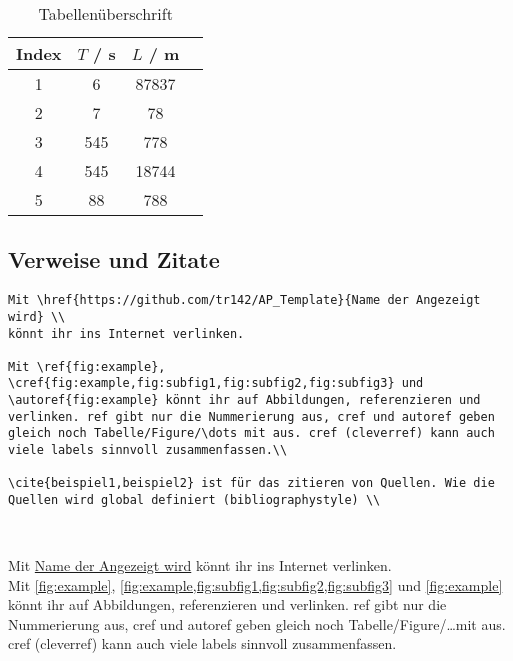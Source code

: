 \documentclass[twoside, 11pt, ngerman, a4paper, biblography=totoc]{article}
\begin{document}
\begin{table}[H] %
\centering %
\caption{Tabellenüberschrift} %
\begin{tabular}{c c c c}  %
\hline %
Index & $T$ / s & $L$ / m \\ %
\hline
1 & 6 & 87837 \\ 
2 & 7 & 78  \\
3 & 545 & 778 \\
4 & 545 & 18744 \\
5 & 88 & 788  \\
\hline
\end{tabular}
	 \label{tab:Tabelle}
\end{table}

\subsection{Verweise und Zitate}

\begin{lstlisting}
Mit \href{https://github.com/tr142/AP_Template}{Name der Angezeigt wird} \\
könnt ihr ins Internet verlinken.

Mit \ref{fig:example}, \cref{fig:example,fig:subfig1,fig:subfig2,fig:subfig3} und \autoref{fig:example} könnt ihr auf Abbildungen, referenzieren und verlinken. ref gibt nur die Nummerierung aus, cref und autoref geben gleich noch Tabelle/Figure/\dots mit aus. cref (cleverref) kann auch viele labels sinnvoll zusammenfassen.\\

\cite{beispiel1,beispiel2} ist für das zitieren von Quellen. Wie die Quellen wird global definiert (bibliographystyle) \\



\end{lstlisting}

Mit \href{https://github.com/tr142/AP_Template}{Name der Angezeigt wird} 
könnt ihr ins Internet verlinken.\\

Mit \ref{fig:example}, \cref{fig:example,fig:subfig1,fig:subfig2,fig:subfig3} und \autoref{fig:example} könnt ihr auf Abbildungen, referenzieren und verlinken. ref gibt nur die Nummerierung aus, cref und autoref geben gleich noch Tabelle/Figure/\dots mit aus. cref (cleverref) kann auch viele labels sinnvoll zusammenfassen.\\
\end{document}
